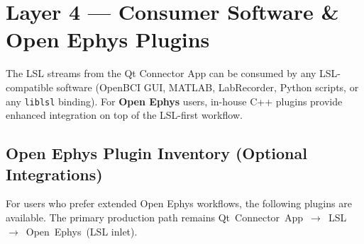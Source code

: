 \documentclass[11pt,a4paper]{article}
\begin{document}
\section{Layer 4 — Consumer Software \& Open Ephys Plugins}
\label{sec:plugins}

The LSL streams from the Qt Connector App can be consumed by any
LSL-compatible software (OpenBCI GUI, MATLAB, LabRecorder, Python scripts,
or any \texttt{liblsl} binding).  For \textbf{Open Ephys} users, in-house
C++ plugins provide enhanced integration on top of the LSL-first workflow.

\subsection{Open Ephys Plugin Inventory (Optional Integrations)}

For users who prefer extended Open Ephys workflows, the following plugins are
available. The primary production path remains
Qt~Connector~App~$\to$~LSL~$\to$~Open~Ephys~(LSL inlet).
\end{document}
